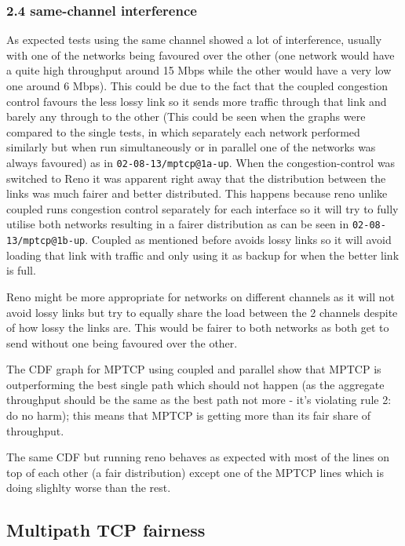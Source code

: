 \documentclass[12pt,a4paper]{article}
\begin{document}
\subsubsection{2.4 same-channel interference}
As expected tests using the same channel showed a lot of interference, usually
with one of the networks being favoured over the other (one network would have a
quite high throughput around 15 Mbps while the other would have a very low one
around 6 Mbps). This could be due to the fact that the coupled congestion
control favours the less lossy link so it sends more traffic through that link
and barely any through to the other (This could be seen when the graphs were
compared to the single tests, in which separately each network performed
similarly but when run simultaneously or in parallel one of the networks was
always favoured) as in \texttt{02-08-13/mptcp@1a-up}. When the
congestion-control was switched to Reno it was apparent right away that the
distribution between the links was much fairer and better distributed. This
happens because reno unlike coupled runs congestion control separately for each
interface so it will try to fully utilise both networks resulting in a fairer
distribution as can be seen in \texttt{02-08-13/mptcp@1b-up}. Coupled as
mentioned before avoids lossy links so it will avoid loading that link with
traffic and only using it as backup for when the better link is full.

Reno might be more appropriate for networks on different channels as it will not
avoid lossy links but try to equally share the load between the 2 channels
despite of how lossy the links are. This would be fairer to both networks as
both get to send without one being favoured over the other.

The CDF graph for MPTCP using coupled and parallel show that MPTCP is
outperforming the best single path which should not happen (as the aggregate
throughput should be the same as the best path not more - it's violating rule 2:
do no harm); this means that MPTCP is getting more than its fair share of
throughput.

The same CDF but running reno behaves as expected with most of the lines on top
of each other (a fair distribution) except one of the MPTCP lines which is doing
slighlty worse than the rest.

\subsection{Multipath TCP fairness}
\end{document}

